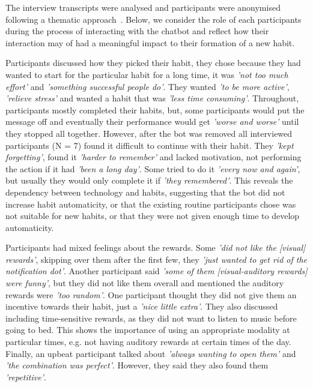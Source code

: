 The interview transcripts were analysed and participants were anonymised following a thematic approach~\cite{thematic_analysis_qualatitive_data}. Below, we consider the role of each participants during the process of interacting with the chatbot and reflect how their interaction may of had a meaningful impact to their formation of a new habit.

Participants discussed how they picked their habit, they chose because they had wanted to start for the particular habit for a long time, it was \textit{'not too much effort'} and \textit{'something successful people do'}. They wanted \textit{'to be more active'}, \textit{'relieve stress'} and wanted a habit that was \textit{'less time consuming'}. Throughout, participants mostly completed their habits, but, some participants would put the message off and eventually their performance would get \textit{'worse and worse'} until they stopped all together. However, after the bot was removed all interviewed participants (N = 7) found it difficult to continue with their habit. They \textit{'kept forgetting'}, found it \textit{'harder to remember'} and lacked motivation, not performing the action if it had \textit{'been a long day'}. Some tried to do it \textit{'every now and again'}, but usually they would only complete it if \textit{'they remembered'}. This reveals the dependency between technology and habits, suggesting that the bot did not increase habit automaticity, or that the existing routine participants chose was not suitable for new habits, or that they were not given enough time to develop automaticity.

Participants had mixed feelings about the rewards. Some \textit{'did not like the [visual] rewards'}, skipping over them after the first few, they \textit{'just wanted to get rid of the notification dot'}. Another participant said \textit{'some of them [visual-auditory rewards] were funny'}, but they did not like them overall and mentioned the auditory rewards were \textit{'too random'}. One participant thought they did not give them an incentive towards their habit, just a \textit{'nice little extra'}. They also discussed including time-sensitive rewards, as they did not want to listen to music before going to bed. This shows the importance of using an appropriate modality at particular times, e.g. not having auditory rewards at certain times of the day. Finally, an upbeat participant talked about \textit{'always wanting to open them'} and \textit{'the combination was perfect'}. However, they said they also found them \textit{'repetitive'}.


